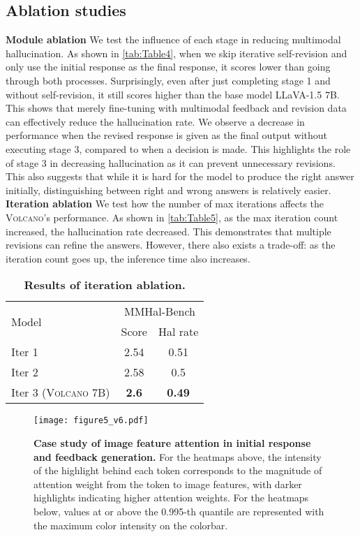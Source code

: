 \documentclass[11pt]{article}
\newcommand{\Ours}{\textsc{Volcano}}
\begin{document}
\subsection{Ablation studies}
\label{subsec:ablation}
\textbf{Module ablation} We test the influence of each stage in reducing multimodal hallucination. As shown in \autoref{tab:Table4}, when we skip iterative self-revision and only use the initial response as the final response, it scores lower than going through both processes. Surprisingly, even after just completing stage 1 and without self-revision, it still scores higher than the base model LLaVA-1.5 7B. This shows that merely fine-tuning with multimodal feedback and revision data can effectively reduce the hallucination rate. We observe a decrease in performance when the revised response is given as the final output without executing stage 3, compared to when a decision is made. This highlights the role of stage 3 in decreasing hallucination as it can prevent unnecessary revisions. This also suggests that while it is hard for the model to produce the right answer initially, distinguishing between right and wrong answers is relatively easier. \\
\noindent \textbf{Iteration ablation} We test how the number of max iterations affects the {\Ours}'s performance. As shown in \autoref{tab:Table5}, as the max iteration count increased, the hallucination rate decreased. This demonstrates that multiple revisions can refine the answers. However, there also exists a trade-off: as the iteration count goes up, the inference time also increases.\\
\begin{table}[t]
\centering
\small
\begin{tabular}{lcc}
\toprule
\multirow{2}{*}{Model} & \multicolumn{2}{c}{MMHal-Bench} \\
& Score  & Hal rate   \\
\midrule
Iter 1  & 2.54 & 0.51  \\
Iter 2 & 2.58 & 0.5  \\
Iter 3 ({\Ours} 7B) & \textbf{2.6} & \textbf{0.49} \\
\bottomrule
\end{tabular}
\caption{\textbf{Results of iteration ablation.}}
\label{tab:Table5}
\end{table}
\begin{figure*}[t]
    \centering
    \texttt{[image: figure5\_v6.pdf]}
    \caption{\textbf{Case study of image feature attention in initial response and feedback generation.} For the heatmaps above, the intensity of the highlight behind each token corresponds to the magnitude of attention weight from the token to image features, with darker highlights indicating higher attention weights. For the heatmaps below, values at or above the 0.995-th quantile are represented with the maximum color intensity on the colorbar.}
    \label{fig:figure5}
\end{figure*}
\FloatBarrier
\end{document}
